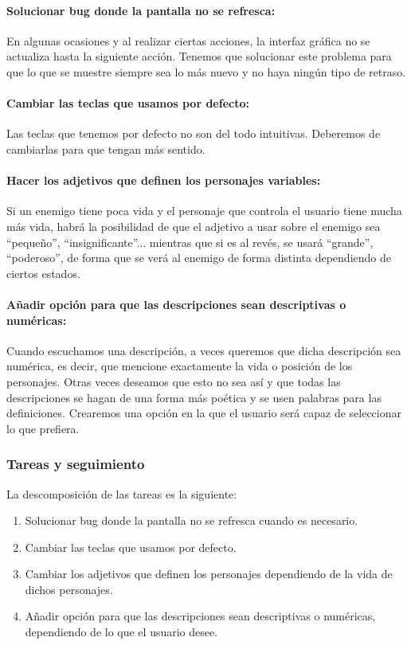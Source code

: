\paragraph{Solucionar bug donde la pantalla no se refresca:} En algunas ocasiones y al realizar ciertas acciones, la interfaz gráfica no se actualiza hasta la siguiente acción. Tenemos que solucionar este problema para que lo que se muestre siempre sea lo más nuevo y no haya ningún tipo de retraso.

\paragraph{Cambiar las teclas que usamos por defecto:} Las teclas que tenemos por defecto no son del todo intuitivas. Deberemos de cambiarlas para que tengan más sentido.

\paragraph{Hacer los adjetivos que definen los personajes variables:} Si un enemigo tiene poca vida y el personaje que controla el usuario tiene mucha más vida, habrá la posibilidad de que el adjetivo a usar sobre el enemigo sea ``pequeño'', ``insignificante''... mientras que si es al revés, se usará ``grande'', ``poderoso'', de forma que se verá al enemigo de forma distinta dependiendo de ciertos estados.

\paragraph{Añadir opción para que las descripciones sean descriptivas o numéricas:} Cuando escuchamos una descripción, a veces queremos que dicha descripción sea numérica, es decir, que mencione exactamente la vida o posición de los personajes. Otras veces deseamos que esto no sea así y que todas las descripciones se hagan de una forma más poética y se usen palabras para las definiciones. Crearemos una opción en la que el usuario será capaz de seleccionar lo que prefiera.

\subsubsection{Tareas y seguimiento}

La descomposición de las tareas es la siguiente:

\begin{enumerate}[label=\bfseries WBS 7.\arabic*]
  \item Solucionar bug donde la pantalla no se refresca cuando es necesario.
  \item Cambiar las teclas que usamos por defecto.
  \item Cambiar los adjetivos que definen los personajes dependiendo de la vida de dichos personajes.
  \item Añadir opción para que las descripciones sean descriptivas o numéricas, dependiendo de lo que el usuario desee.
\end{enumerate}


